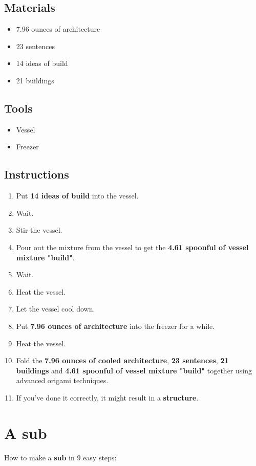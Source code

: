 \documentclass{article}
\begin{document}
\subsection{Materials}\begin{itemize}
\item 
7.96 ounces of architecture
\item 
23 sentences
\item 
14 ideas of build
\item 
21 buildings
\end{itemize}
\subsection{Tools}\begin{itemize}
\item 
Vessel
\item 
Freezer
\end{itemize}
\subsection{Instructions}\begin{enumerate}
\item 
Put \textbf{14 ideas of build} into the vessel.
\item 
Wait.
\item 
Stir the vessel.
\item 
Pour out the mixture from the vessel to get the \textbf{4.61 spoonful of vessel mixture "build"}.
\item 
Wait.
\item 
Heat the vessel.
\item 
Let the vessel cool down.
\item 
Put \textbf{7.96 ounces of architecture} into the freezer for a while.
\item 
Heat the vessel.
\item 
Fold the \textbf{7.96 ounces of cooled architecture}, \textbf{23 sentences}, \textbf{21 buildings} and \textbf{4.61 spoonful of vessel mixture "build"} together using advanced origami techniques.
\item 
If you've done it correctly, it might result in a \textbf{structure}.
\end{enumerate}
\newpage
\section{A sub}How to make a \textbf{sub} in 9 easy steps:
\end{document}
